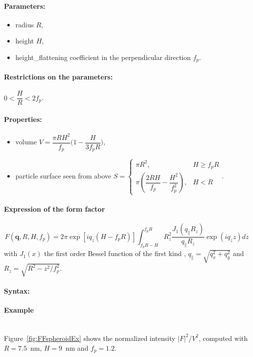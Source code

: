 \paragraph{Parameters:}
\begin{itemize}
\item radius $R$,
\item height $H$,
\item height\_flattening coefficient in the perpendicular direction $f_p$.
\end{itemize}

\paragraph{Restrictions on the parameters:} $0< \dfrac{H}{R}< 2f_p$.

\paragraph{Properties:}
\begin{itemize}
\item volume $V = \dfrac{\pi R H^2}{f_p}  \Big(1-\dfrac{H}{3f_p R}\Big)$,
\item particle surface seen from above $S = \left\{\begin{array}{ll} \pi R^2, & H \geq f_pR \\
         \pi\left(\dfrac{2RH}{f_p}-\dfrac{H^2}{f_p^2}\right), & H < R \end{array}\right.$.
\end{itemize}

\paragraph{Expression of the form factor}
\begin{equation*} 
F(\mathbf{q},R, H,f_p) =   2\pi \exp[iq_z(H-f_pR)] \int_{f_p R-H} ^{f_p R} R_z
        ^2\frac{J_1(q_{\parallel}R_z)}{q_{\parallel}R_z} \exp(i q_z z) dz
\end{equation*}
with $J_1(x)$ the first order
Bessel function of the first kind \cite{AbSt64}, $q_{\parallel}=\sqrt{q_x^2+q_y^2} $ and $R_z=\sqrt{R^2-z^2/f_p^2}$.

\paragraph{Syntax:} 

\paragraph{Example}\mbox{}\\
Figure~\ref{fig:FFspheroidEx} shows the normalized intensity
$|F|^2/V^2$, computed with $R=7.5$~nm, $H=9$~nm and $f_p=1.2$.

